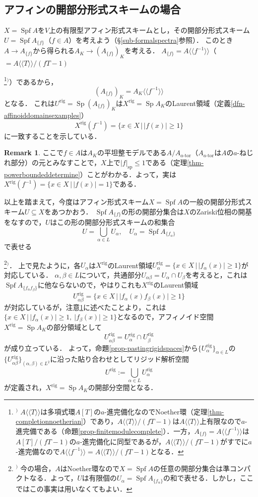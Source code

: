\documentclass[a4paper,12pt, dvipdfmx]{jsbook}
\def\rig{\mathop{\mathrm{rig}}\nolimits}
\def\sp{\mathop{\mathrm{sp}}\nolimits}
\def\Spf{\mathop{\mathrm{Spf}}\nolimits}
\def\Sp{\mathop{\mathrm{Sp}}\nolimits}
\def\ator{\textrm{$a$-}\mathrm{tor}}
\def\dl{\langle\!\langle}
\def\dr{\rangle\!\rangle}
\newcommand{\abs}[1]{\lvert#1\rvert}
\theoremstyle{plain}
\theoremstyle{definition}
\newtheorem{rem}[thm]{\bfseries Remark}
\newcounter{chushaku}
\def\chu#1{\addtocounter{chushaku}{1}\footnote[\value{chushaku}]{${}^)$ #1}${}^)$}
\begin{document}
\subsection{アフィンの開部分形式スキームの場合}\label{sub-opensubcase}
$X=\Spf A$を$V$上の有限型アフィン形式スキームとし，その開部分形式スキーム$U=\Spf A_{\{f\}}$（$f\in A$）を考えよう（\S\ref{sub-formalspectra}参照）．
このとき$A\rightarrow A_{\{f\}}$から得られる$A_K\rightarrow(A_{\{f\}})_K$を考える．
$A_{\{f\}}=A\dl f^{-1}\dr$（$=A\dl T\dr/(fT-1)$\chu{$A\dl T\dr$は多項式環$A[T]$の$a$-進完備化なのでNoether環（定理\ref{thm-completionnoetherian}）であり，$A\dl T\dr/(fT-1)$は$A\dl T\dr$上有限なので$a$-進完備である（命題\ref{prop-finitemodulecomplete}）．一方，$A_{\{f\}}=A\dl f^{-1}\dr$は$A[T]/(fT-1)$の$a$-進完備化に同型であるが，$A\dl T\dr/(fT-1)$がすでに$a$-進完備なので$A\dl f^{-1}\dr=A\dl T\dr/(fT-1)$となる．}）であるから，
$$
(A_{\{f\}})_K=A_K\dl f^{-1}\dr
$$
となる．
これは$U^{\rig}=\Sp(A_{\{f\}})_K$は$X^{\rig}=\Sp A_K$のLaurent領域（定義\ref{dfn-affinoiddomainsexamples}）
$$
X^{\rig}(f^{-1})=\{x\in X\,|\,\abs{f(x)}\geq 1\}
$$
に一致することを示している．
\begin{rem}\label{rem-opensubcase}{\rm 
ここで$f\in A$は$A_K$の平坦整モデルである$A/A_{\ator}$（$A_{\ator}$は$A$の$a$-ねじれ部分）の元とみなすことで，$X$上で$\abs{f}_{\sp}\leq 1$である（定理\ref{thm-powerboundeddetermine}）ことがわかる．よって，実は$X^{\rig}(f^{-1})=\{x\in X\,|\,\abs{f(x)}=1\}$である．}
\end{rem}

以上を踏まえて，今度はアフィン形式スキーム$X=\Spf A$の一般の開部分形式スキーム$U\subseteq X$をあつかおう．
$\Spf A_{\{f\}}$の形の開部分集合は$X$のZariski位相の開基をなすので，$U$はこの形の開部分形式スキームの和集合
$$
U=\bigcup_{\alpha\in L}U_{\alpha},\quad U_{\alpha}=\Spf A_{\{f_{\alpha}\}}
$$
で表せる\chu{今の場合，$A$はNoether環なので$X=\Spf A$の任意の開部分集合は準コンパクトなる．よって，$U$は有限個の$U_{\alpha}=\Spf A_{\{f_{\alpha}\}}$の和で表せる．しかし，ここではこの事実は用いなくてもよい．}．
上で見たように，各$U_{\alpha}$は$X^{\rig}$のLaurent領域$U^{\rig}_{\alpha}=\{x\in X\,|\,\abs{f_{\alpha}(x)}\geq 1\}$が対応している．
$\alpha,\beta\in L$について，共通部分$U_{\alpha\beta}=U_{\alpha}\cap U_{\beta}$を考えると，これは$\Spf A_{\{f_{\alpha}f_{\beta}\}}$に他ならないので，やはりこれも$X^{\rig}$のLaurent領域
$$
U^{\rig}_{\alpha\beta}=\{x\in X\,|\,\abs{f_{\alpha}(x)f_{\beta}(x)}\geq 1\}
$$
が対応しているが，注意\ref{rem-opensubcase}に述べたことより，これは$\{x\in X\,|\,\abs{f_{\alpha}(x)}\geq 1,\ \abs{f_{\beta}(x)}\geq 1\}$となるので，アフィノイド空間$X^{\rig}=\Sp A_K$の部分領域として
$$
U^{\rig}_{\alpha\beta}=U^{\rig}_{\alpha}\cap U^{\rig}_{\beta}
$$
が成り立っている．
よって，命題\ref{prop-pastingrigidspaces}から$\{U^{\rig}_{\alpha}\}_{\alpha\in L}$の$\{U^{\rig}_{\alpha\beta}\}_{(\alpha,\beta)\in L^2}$に沿った貼り合わせとしてリジッド解析空間
$$
U^{\rig}:=\bigcup_{\alpha\in L}U^{\rig}_{\alpha}
$$
が定義され，$X^{\rig}=\Sp A_K$の開部分空間となる．
\end{document}
